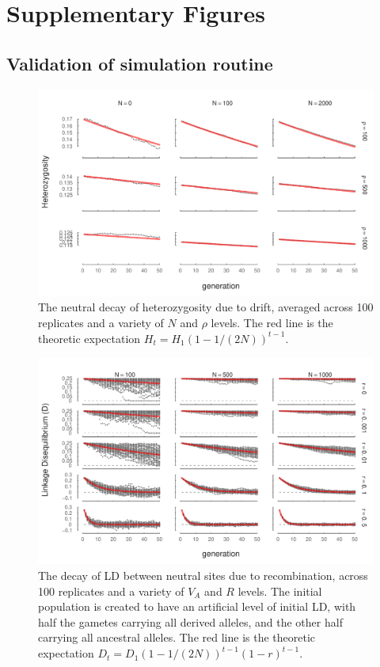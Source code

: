 \documentclass[11pt]{article}
\begin{document}
\setcounter{figure}{0}    

\newpage
\section{Supplementary Figures}

\subsection{Validation of simulation routine}

\begin{figure}[!ht]
  \centering
  \includegraphics{./images/supp-het-neutral.pdf}

\caption{The neutral decay of heterozygosity due to drift, averaged across 100
replicates and a variety of $N$ and $\rho$ levels. The red line is the
theoretic expectation $H_t = H_1 (1-1/(2N))^{t-1}$.}

\label{fig:het-neut}
\end{figure}


\begin{figure}[!ht]
  \centering
  \includegraphics{./images/supp-ld-neutral.pdf}

  \caption{The decay of LD between neutral sites due to recombination, across
    100 replicates and a variety of $V_A$ and $R$ levels. The initial
    population is created to have an artificial level of initial LD, with half
    the gametes carrying all derived alleles, and the other half carrying all
  ancestral alleles. The red line is the theoretic expectation $D_t = D_1 (1-1/(2N))^{t-1} (1-r)^{t-1}$.}

  \label{fig:ld-neut}
\end{figure}
\end{document}
